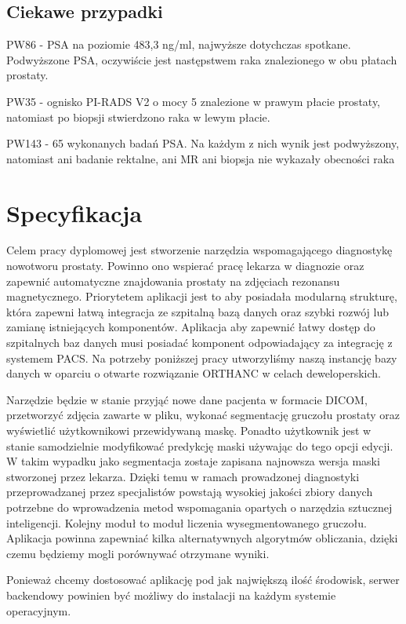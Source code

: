 \documentclass[a4paper,11pt,twoside]{report}
\theoremstyle{definition}
\begin{document}
\section{Ciekawe przypadki}
\par
\begin{description}
\item  PW86 - PSA na poziomie 483,3 ng/ml, najwyższe dotychczas spotkane. Podwyższone PSA, oczywiście jest następstwem raka znalezionego w obu płatach prostaty.
\item  PW35 - ognisko PI-RADS V2 o mocy 5 znalezione w prawym płacie prostaty, natomiast po biopsji stwierdzono raka w lewym płacie.
\item  PW143 - 65 wykonanych badań PSA. Na każdym z nich wynik jest podwyższony, natomiast ani badanie rektalne, ani MR ani biopsja nie wykazały obecności raka
\end{description}


\chapter{Specyfikacja} %

Celem pracy dyplomowej jest stworzenie narzędzia wspomagającego diagnostykę nowotworu prostaty. Powinno ono wspierać pracę lekarza w diagnozie oraz zapewnić automatyczne znajdowania prostaty na zdjęciach rezonansu magnetycznego. Priorytetem aplikacji jest to aby posiadała modularną strukturę, która zapewni łatwą integracja ze szpitalną bazą danych oraz szybki rozwój lub zamianę istniejących komponentów. Aplikacja aby zapewnić łatwy dostęp do szpitalnych baz danych musi posiadać komponent odpowiadający za integrację z systemem PACS. Na potrzeby poniższej pracy utworzyliśmy naszą instancję bazy danych w oparciu o otwarte rozwiązanie ORTHANC \cite{Orthanc} w celach deweloperskich.
\par
Narzędzie będzie w stanie przyjąć nowe dane pacjenta w formacie DICOM, przetworzyć zdjęcia zawarte w pliku, wykonać segmentację gruczołu prostaty oraz wyświetlić użytkownikowi przewidywaną maskę. Ponadto użytkownik jest w stanie samodzielnie modyfikować predykcję maski używając do tego opcji edycji. W takim wypadku jako segmentacja zostaje zapisana najnowsza wersja maski stworzonej przez lekarza. Dzięki temu w ramach prowadzonej diagnostyki przeprowadzanej przez specjalistów powstają wysokiej jakości zbiory danych potrzebne do wprowadzenia metod wspomagania opartych o narzędzia sztucznej inteligencji. Kolejny moduł to moduł liczenia wysegmentowanego gruczołu. Aplikacja powinna zapewniać kilka alternatywnych algorytmów obliczania, dzięki czemu będziemy mogli porównywać otrzymane wyniki.
\par
Ponieważ chcemy dostosować aplikację pod jak największą ilość środowisk, serwer backendowy powinien być możliwy do instalacji na każdym systemie operacyjnym.
\end{document}
